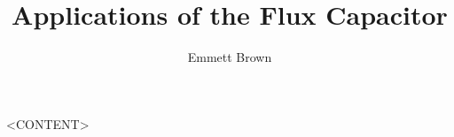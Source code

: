 \documentclass[11pt]{book}
\title{Applications of the Flux Capacitor}
\author{Emmett Brown}
\begin{document}
\maketitle
<CONTENT>
\end{document}

